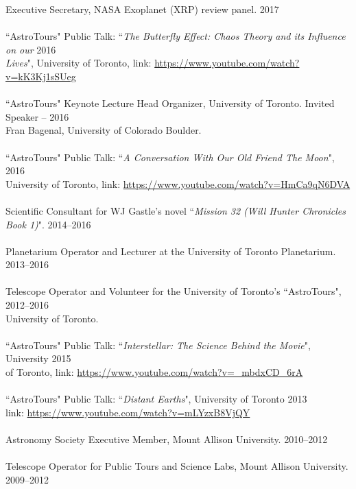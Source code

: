 \documentclass[10pt]{res} %
\begin{document}
\begin{resume}
\vspace{8pt} %
Executive Secretary, NASA Exoplanet (XRP) review panel. \hfill 2017 \\ \\
``AstroTours" Public Talk: ``{\sl The Butterfly Effect: Chaos Theory and its Influence on our} \hfill 2016 \\ 
{\sl Lives}", University of Toronto, link: \url{https://www.youtube.com/watch?v=kK3Kj1sSUeg} \\ \\
``AstroTours" Keynote Lecture Head Organizer, University of Toronto. Invited Speaker -- \hfill 2016 \\ 
Fran Bagenal, University of Colorado Boulder. \\ \\ 
``AstroTours" Public Talk: ``{\sl A Conversation With Our Old Friend The Moon}",  \hfill 2016 \\ 
University of Toronto, link: \url{https://www.youtube.com/watch?v=HmCa9qN6DVA} \\ \\ 
Scientific Consultant for WJ Gastle's novel ``{\sl Mission 32 (Will Hunter Chronicles Book 1)}". \hfill 2014--2016 \\ \\
Planetarium Operator and Lecturer at the University of Toronto Planetarium. \hfill 2013--2016 \\ \\
Telescope Operator and Volunteer for the University of Toronto's ``AstroTours", \hfill 2012--2016 \\
University of Toronto. \\ \\ 
``AstroTours" Public Talk: ``{\sl Interstellar: The Science Behind the Movie}", University  \hfill 2015 \\ 
of Toronto, link: \url{https://www.youtube.com/watch?v=_mbdxCD_6rA} \\ \\
``AstroTours" Public Talk: ``{\sl Distant Earths}", University of Toronto \hfill 2013 \\
link: \url{https://www.youtube.com/watch?v=mLYzxB8VjQY} \\ \\
Astronomy Society Executive Member, Mount Allison University. \hfill 2010--2012 \\ \\
Telescope Operator for Public Tours and Science Labs, Mount Allison University. \hfill 2009--2012


\vspace{0.2in} %



\vspace{0.2in} %


\end{resume} 
\end{document}

